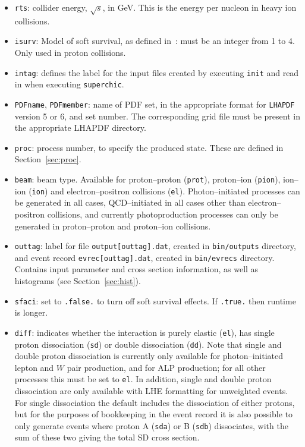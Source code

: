 \documentclass[12pt]{article}
\begin{document}
\begin{itemize}
\item \texttt{rts}: collider energy, $\sqrt{s}$, in GeV. This is the energy per nucleon in heavy ion collisions.
\item \texttt{isurv}: Model of soft survival, as defined in~\cite{Khoze:2013dha}: must be an integer from 1 to 4. Only used in proton collisions.
\item \texttt{intag}:  defines the label for the input files created by executing \texttt{init} and read in when executing \texttt{superchic}.
\item \texttt{PDFname}, \texttt{PDFmember}: name of PDF set, in the appropriate format for \texttt{LHAPDF} version 5 or 6, and set number. The corresponding grid file must be present in the appropriate LHAPDF directory.
\item \texttt{proc}: process number, to specify the produced state. These are defined in Section~\ref{sec:proc}.
\item \texttt{beam}: beam type. Available for proton--proton (\texttt{prot}), proton--ion (\texttt{pion}), ion--ion (\texttt{ion}) and electron--positron collisions (\texttt{el}). Photon--initiated processes can be generated in all cases, QCD--initiated in all cases other than electron--positron collisions, and currently photoproduction processes can only be generated in proton--proton and proton--ion collisions.
\item \texttt{outtag}: label for file \texttt{output[outtag].dat}, created in \texttt{bin/outputs} directory, and event record  \texttt{evrec[outtag].dat}, created in \texttt{bin/evrecs} directory. Contains input parameter and cross section information, as well as histograms (see Section~\ref{sec:hist}).
\item \texttt{sfaci}: set to \texttt{.false.} to turn off soft survival effects. If \texttt{.true.} then runtime is longer.
\item \texttt{diff}: indicates whether the interaction is purely elastic (\texttt{el}), has single proton dissociation (\texttt{sd}) or double dissociation (\texttt{dd}).
Note that single and double proton dissociation is currently only available for photon--initiated lepton and $W$ pair production, and for ALP production; for all other processes this must be set to \texttt{el}. In addition, single and double proton dissociation are only available with LHE formatting for unweighted events. For single dissociation the default includes the dissociation of either protons, but for the purposes of bookkeeping in the event record it is also possible to only generate events where proton A (\texttt{sda}) or B (\texttt{sdb}) dissociates, with the sum of these two giving the total SD cross section.

\end{itemize}
\end{document}
